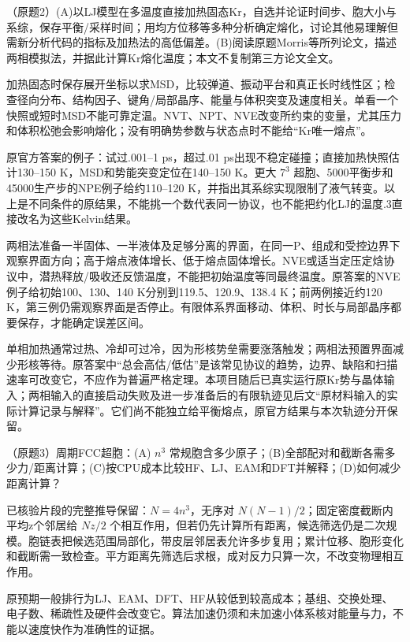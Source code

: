 \begin{exercise}\label{task:lab4-2}
（原题2）(A)以LJ模型在多温度直接加热固态Kr，自选并论证时间步、胞大小与系综，保存平衡/采样时间；用均方位移等多种分析确定熔化，讨论其他易理解但需新分析代码的指标及加热法的高低偏差。(B)阅读原题Morris等所列论文，描述两相模拟法，并据此计算Kr熔化温度；本文不复制第三方论文全文。
\end{exercise}
\begin{solution}
加热固态时保存展开坐标以求MSD，比较弹道、振动平台和真正长时线性区；检查径向分布、结构因子、键角/局部晶序、能量与体积突变及速度相关。单看一个快照或短时MSD不能可靠定温。NVT、NPT、NVE改变所约束的变量，尤其压力和体积松弛会影响熔化；没有明确势参数与状态点时不能给“Kr唯一熔点”。

原官方答案的例子：试过.001--1 ps，超过.01 ps出现不稳定碰撞；直接加热快照估计130--150 K，MSD和势能突变定位在140--150 K。更大 $7^3$ 超胞、5000平衡步和45000生产步的NPE例子给约110--120 K，并指出其系综实现限制了液气转变。以上是不同条件的原结果，不能挑一个数代表同一协议，也不能把约化LJ的温度.3直接改名为这些Kelvin结果。

两相法准备一半固体、一半液体及足够分离的界面，在同一P、组成和受控边界下观察界面方向；高于熔点液体增长、低于熔点固体增长。NVE或适当定压定焓协议中，潜热释放/吸收还反馈温度，不能把初始温度等同最终温度。原答案的NVE例子给初始100、130、140 K分别到119.5、120.9、138.4 K；前两例接近约120 K，第三例仍需观察界面是否停止。有限体系界面移动、体积、时长与局部晶序都要保存，才能确定误差区间。

单相加热通常过热、冷却可过冷，因为形核势垒需要涨落触发；两相法预置界面减少形核等待。原答案中“总会高估/低估”是该常见协议的趋势，边界、缺陷和扫描速率可改变它，不应作为普遍严格定理。本项目随后已真实运行原Kr势与晶体输入；两相输入的直接启动失败及进一步准备后的有限轨迹见后文“原材料输入的实际计算记录与解释”。它们尚不能独立给平衡熔点，原官方结果与本次轨迹分开保留。
\end{solution}

\begin{exercise}\label{task:lab4-3}
（原题3）周期FCC超胞：(A) $n^3$ 常规胞含多少原子；(B)全部配对和截断各需多少力/距离计算；(C)按CPU成本比较HF、LJ、EAM和DFT并解释；(D)如何减少距离计算？
\end{exercise}
\begin{solution}
已核验片段的完整推导保留：$N=4n^3$，无序对 $N(N-1)/2$；固定密度截断内平均z个邻居给 $Nz/2$ 个相互作用，但若仍先计算所有距离，候选筛选仍是二次规模。胞链表把候选范围局部化，带皮层邻居表允许多步复用；累计位移、胞形变化和截断需一致检查。平方距离先筛选后求根，成对反力只算一次，不改变物理相互作用。

原预期一般排行为LJ、EAM、DFT、HF从较低到较高成本；基组、交换处理、电子数、稀疏性及硬件会改变它。算法加速仍须和未加速小体系核对能量与力，不能以速度快作为准确性的证据。
\end{solution}

